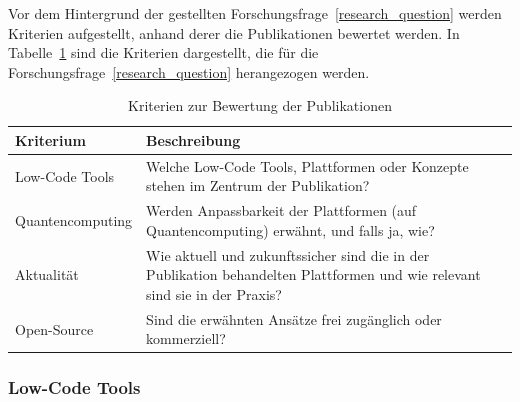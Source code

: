 Vor dem Hintergrund der gestellten Forschungsfrage~\ref{research_question} werden Kriterien aufgestellt, anhand derer die Publikationen 
bewertet werden. In Tabelle~\ref{tab:evaluation_criteria} sind die Kriterien dargestellt, die für die Forschungsfrage~\ref{research_question} 
herangezogen werden. 

\begin{table}[h!]
    \centering
    \caption{Kriterien zur Bewertung der Publikationen}
    \label{tab:evaluation_criteria}
    \begin{tabular}{|p{5cm}|p{9cm}|}
    \hline
    \textbf{Kriterium} & \textbf{Beschreibung} \\ \hline
    Low-Code Tools & Welche Low-Code Tools, Plattformen oder Konzepte stehen im Zentrum der Publikation? \\ \hline
    Quantencomputing & Werden Anpassbarkeit der Plattformen (auf Quantencomputing) erwähnt, und falls ja, wie? \\ \hline
    Aktualität & Wie aktuell und zukunftssicher sind die in der Publikation behandelten Plattformen und wie relevant sind sie in der Praxis? \\ \hline
    Open-Source & Sind die erwähnten Ansätze frei zugänglich oder kommerziell? \\ \hline
    \end{tabular}
\end{table}

\subsubsection{Low-Code Tools}


